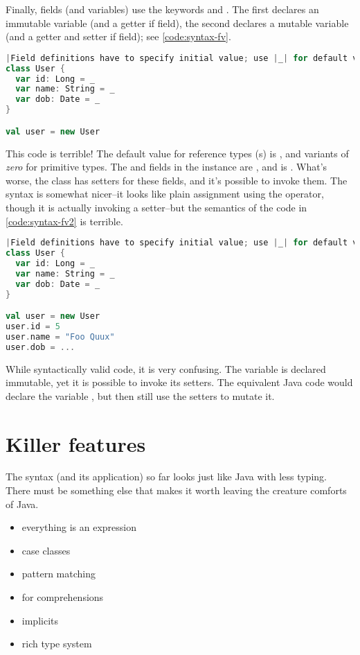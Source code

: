 \documentclass[10 pt]{article}
\begin{document}
Finally, fields (and variables) use the keywords  and . The first declares an immutable variable (and a getter if field), the second declares a mutable variable (and a getter and setter if field); see \autoref{code:syntax-fv}.

\begin{lstlisting}[caption={Fields \& variables}, label={code:syntax-fv}, language=Scala, escapechar=|]
|Field definitions have to specify initial value; use |_| for default value.|
class User {
  var id: Long = _
  var name: String = _
  var dob: Date = _
}

val user = new User
\end{lstlisting}

This code is terrible! The default value for reference types (s) is , and variants of \emph{zero} for primitive types. The  and  fields in the  instance are , and  is . What's worse, the class has setters for these fields, and it's possible to invoke them. The syntax is somewhat nicer--it looks like plain assignment using the \pcode{=} operator, though it is actually invoking a setter--but the semantics of the code in \autoref{code:syntax-fv2} is terrible.

\begin{lstlisting}[caption={Fields \& variables II}, label={code:syntax-fv2}, language=Scala, escapechar=|]
|Field definitions have to specify initial value; use |_| for default value.|
class User {
  var id: Long = _
  var name: String = _
  var dob: Date = _
}

val user = new User
user.id = 5
user.name = "Foo Quux"
user.dob = ...
\end{lstlisting}

While syntactically valid code, it is very confusing. The  variable is declared immutable, yet it is possible to invoke its setters. The equivalent Java code would declare the  variable , but then still use the setters to mutate it.

\section{Killer features}
The syntax (and its application) so far looks just like Java with less typing. There must be something else that makes it worth leaving the creature comforts of Java. 

\begin{itemize}
  \item everything is an expression
  \item case classes
  \item pattern matching
  \item for comprehensions
  \item implicits
  \item rich type system
\end{itemize}
\end{document}
